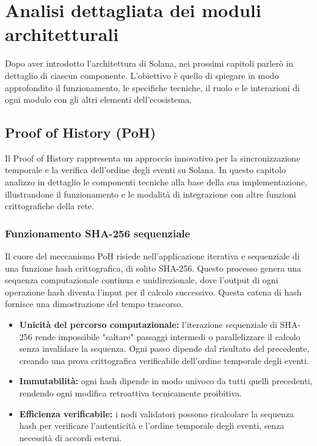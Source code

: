 \documentclass[a4paper,12pt]{report}
\begin{document}
	\chapter{Analisi dettagliata dei moduli architetturali}
	
	Dopo aver introdotto l'architettura di Solana, nei prossimi capitoli parlerò in dettaglio di ciascun componente. L'obiettivo è quello di spiegare in modo approfondito il funzionamento, le specifiche tecniche, il ruolo e le interazioni di ogni modulo con gli altri elementi dell'ecosistema.
	
	\section{Proof of History (PoH)}
	Il Proof of History rappresenta un approccio innovativo per la sincronizzazione temporale e la verifica dell’ordine degli eventi su Solana. In questo capitolo analizzo in dettaglio le componenti tecniche alla base della sua implementazione, illustrandone il funzionamento e le modalità di integrazione con altre funzioni crittografiche della rete.
	
	\subsection{Funzionamento SHA-256 sequenziale}
	Il cuore del meccanismo PoH risiede nell'applicazione iterativa e sequenziale di una funzione hash crittografica, di solito SHA-256. Questo processo genera una sequenza computazionale continua e unidirezionale, dove l'output di ogni operazione hash diventa l'input per il calcolo successivo. Questa catena di hash fornisce una dimostrazione del tempo trascorso.
	\begin{itemize}
		\item \textbf{Unicità del percorso computazionale:} l’iterazione sequenziale di SHA-256 rende impossibile "saltare" passaggi intermedi o parallelizzare il calcolo senza invalidare la sequenza. Ogni passo dipende dal risultato del precedente, creando una prova crittografica verificabile dell'ordine temporale degli eventi.
		\item \textbf{Immutabilità:} ogni hash dipende in modo univoco da tutti quelli precedenti, rendendo ogni modifica retroattiva tecnicamente proibitiva.
		\item \textbf{Efficienza verificabile:} i nodi validatori possono ricalcolare la sequenza hash per verificare l’autenticità e l’ordine temporale degli eventi, senza necessità di accordi esterni.
	\end{itemize}
	
\end{document}
